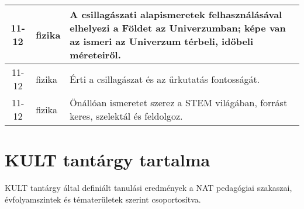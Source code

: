 \begin{small}
\begin{longtable}{c | p{2cm} |  p{11cm} }
              11-12 & fizika & A csillagászati alapismeretek felhasználásával elhelyezi a Földet az Univerzumban; képe van az ismeri az Univerzum térbeli, időbeli méreteiről. \\ \hline
              11-12 & fizika & Érti a csillagászat és az űrkutatás fontosságát. \\ \hline
              11-12 & fizika & Önállóan ismeretet szerez a STEM világában, forrást keres, szelektál és feldolgoz. \\ \hline
      \end{longtable}
\end{small}




\section{KULT tantárgy tartalma }
KULT tantárgy által definiált tanulási eredmények a NAT pedagógiai szakaszai, évfolyamszintek és tématerületek szerint csoportosítva.

